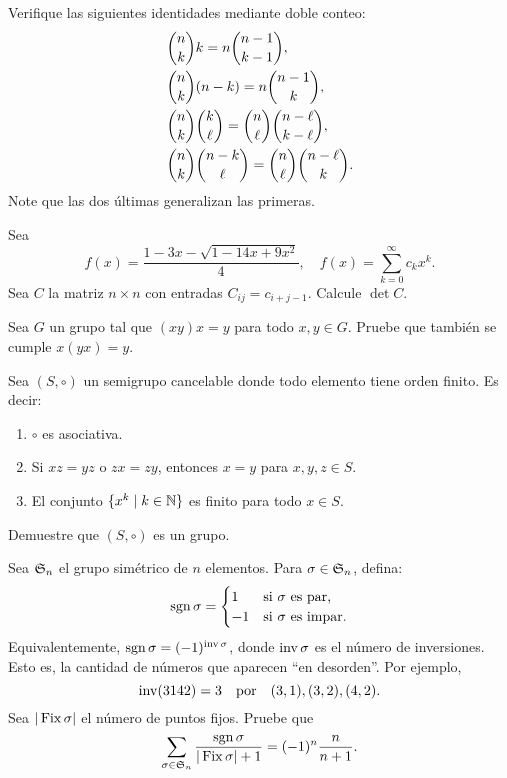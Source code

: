 \documentclass[12pt]{memoir}
\begin{document}
\setcounter{chapter}{1}

\begin{Ej}[Combinatoria]
    Verifique las siguientes identidades mediante doble conteo:
    \begin{align}
        &\binom{n}{k}k = n\binom{n-1}{k-1},\\
        &\binom{n}{k}(n-k) = n\binom{n-1}{k},\\
        &\binom{n}{k}\binom{k}{\ell} = \binom{n}{\ell}\binom{n-\ell}{k-\ell},\\
        &\binom{n}{k}\binom{n-k}{\ell} = \binom{n}{\ell}\binom{n-\ell}{k}.
    \end{align}
    Note que las dos últimas generalizan las primeras.
\end{Ej}

\begin{Ej}[Putnam 2024 A6]%
    Sea
    \[
    f(x)=\frac{1-3x-\sqrt{1-14x+9x^2}}{4},\quad f(x)=\sum_{k=0}^{\infty}c_kx^k.
    \]
    Sea $C$ la matriz $n\times n$ con entradas $C_{ij}=c_{i+j-1}$. Calcule $\det C$.
\end{Ej}

\begin{Ej}[Putnam 2001 A2]
    Sea $G$ un grupo tal que $(xy)x = y$ para todo $x,y\in G$. Pruebe que también se cumple $x(yx)=y$.
\end{Ej}

\begin{Ej}[Putnam 1989 B2]%
    Sea $(S,\circ)$ un semigrupo cancelable donde todo elemento tiene orden finito. Es decir:
    \begin{enumerate}
        \item $\circ$ es asociativa.
        \item Si $xz=yz$ o $zx=zy$, entonces $x=y$ para $x,y,z \in S$.
        \item El conjunto $\{x^k\mid k\in\bN\}$ es finito para todo $x\in S$.
    \end{enumerate}
    Demuestre que $(S,\circ)$ es un grupo.
\end{Ej}
\newpage
\begin{Ej}[Putnam 2005 B6]
    Sea $\mathfrak{S}_n$ el grupo simétrico de $n$ elementos. Para $\sigma\in\mathfrak{S}_n$, defina:
    \[
    \operatorname{sgn} \sigma =
    \begin{cases}
        1 & \text{si $\sigma$ es par,}\\
        -1 & \text{si $\sigma$ es impar.}
    \end{cases}
    \]
    Equivalentemente, $\operatorname{sgn}\sigma = (-1)^{\operatorname{inv}\sigma}$, donde $\operatorname{inv}\sigma$ es el número de inversiones. Esto es, la cantidad de números que aparecen ``en desorden''. Por ejemplo,
    $$\operatorname{inv}(3142)=3\quad\text{por}\quad(3,1),(3,2),(4,2).$$
    Sea $|\operatorname{Fix} \sigma|$ el número de puntos fijos. Pruebe que
    \[
    \sum_{\sigma\in\mathfrak{S}_n}\frac{\operatorname{sgn} \sigma}{|\operatorname{Fix}\sigma|+1} = (-1)^n\frac{n}{n+1}.
    \]
\end{Ej}
\end{document}
